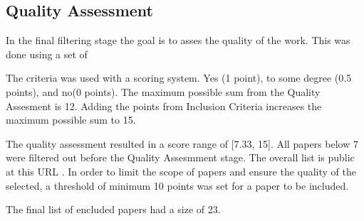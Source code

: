 \subsection{Quality Assessment}
In the final filtering stage the goal is to asses the quality of the work. This was done using a set of 

The criteria was used with a scoring system. Yes (1 point), to some degree (0.5 points), and no(0 points).
The maximum possible sum from the Quality Assesment is 12. Adding the points from Inclusion Criteria 
increases the maximum possible sum to 15.

The quality assessment resulted in a score range of [7.33, 15]. All papers below 7 were filtered out before 
the Quality Assesmment stage. 
The overall list is public at this URL \cite{SLR-cutoff}.
In order to limit the scope of papers and ensure the quality of the selected, a threshold of minimum 10 points
was set for a paper to be included.

The final list of encluded papers had a size of 23.